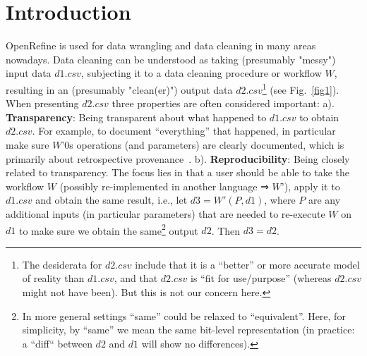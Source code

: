 \documentclass[runningheads]{llncs}
\begin{document}
%
%
%
\section{Introduction}
OpenRefine is used for data wrangling and data cleaning in many areas nowadays. Data cleaning can be understood as taking (presumably "messy") input data $d1.csv$, subjecting it to a data cleaning procedure or workflow $W$, resulting in an (presumably "clean(er)") output data $d2.csv$\footnote[1]{The desiderata for $d2.csv$ include that it is a “better” or more accurate model of reality than $d1.csv$, and that $d2.csv$ is “fit for use/purpose” (whereas $d2.csv$ might not have been). But this is not our concern here.} (see Fig.~\ref{fig1}). When presenting $d2.csv$ three properties are often considered important: a). \textbf{Transparency}: Being transparent about what happened to $d1.csv$ to obtain $d2.csv$. For example, to document “everything” that happened, in particular make sure $W$'0s operations (and parameters) are clearly documented, which is primarily about retrospective provenance~\cite{ref_lncs1}. b). \textbf{Reproducibility}: Being closely related to transparency. The focus lies in that a user should be able to take the workflow $W$ (possibly re-implemented in another language ⇒ $W’$), apply it to $d1.csv$ and obtain the same result, i.e., let \(d3=W'(P,d1)\), where $P$ are any additional inputs (in particular parameters) that are needed to re-execute $W$ on $d1$ to make sure we obtain the same\footnote[1]{In more general settings “same” could be relaxed to “equivalent”. Here, for simplicity, by “same” we mean the same bit-level representation (in practice: a “diff“ between $d2$ and $d1$ will show no differences).} output $d2$. Then \(d3=d2\).
\end{document}
